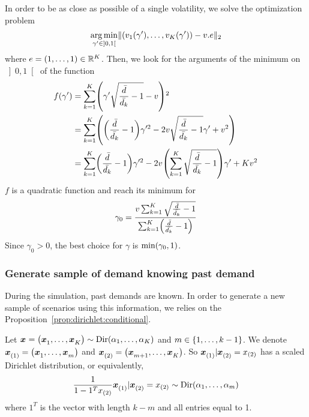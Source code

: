 In order to be as close as possible of a single volatility, we solve the optimization problem
\begin{equation}\label{eq:dirichlet:optimization}
  \argmin_{\gamma'\in\left]0,1\right[} \norm{\bracket{v_1\bracket{\gamma'},\ldots,v_K\bracket{\gamma'}} - v.e}_2
\end{equation}
where $e=\bracket{1,\ldots,1}\in\RR^K$. Then, we look for the arguments of the minimum on $\left]0,1\right[$ of the function
\begin{subequations}
\begin{align}
  f\bracket{\gamma'}
  &= \sum_{k=1}^K \bracket{\gamma'\sqrt{\frac{\bar{\demand}}{\bar{\demand_k}}-1}-v}^2
  \\
  &= \sum_{k=1}^K
  \bracket{
  \bracket{\frac{\bar{\demand}}{\bar{\demand_k}}-1}\gamma'^2
  - 2v\sqrt{\frac{\bar{\demand}}{\bar{\demand_k}}-1}\gamma'
  + v^2
  }
  \\
  &= \sum_{k=1}^K\bracket{\frac{\bar{\demand}}{\bar{\demand_k}}-1}\gamma'^2
  - 2v\bracket{\sum_{k=1}^K\sqrt{\frac{\bar{\demand}}{\bar{\demand_k}}-1}}\gamma'
  + K v^2
\end{align}
\end{subequations}
$f$ is a quadratic function and reach its minimum for
\begin{equation}
  \gamma_0
  =
  \frac
  {v\sum_{k=1}^K\sqrt{\frac{\bar{\demand}}{\bar{\demand_k}}-1}}
  {\sum_{k=1}^K\bracket{\frac{\bar{\demand}}{\bar{\demand_k}}-1}}
\end{equation}
Since $\gamma_0>0$, the best choice for $\gamma$ is $\min\bracket{\gamma_0,1}$.




\subsubsection{Generate sample of demand knowing past demand}


During the simulation, past demands are known. In order to generate a new sample of scenarios using this information, we relies on the Proposition~\ref{prop:dirichlet:conditional}.


\begin{prop}\label{prop:dirichlet:conditional}
  Let $\va x=\bracket{\va x_1,\ldots,\va x_K}\sim \Dir\bracket{\alpha_1,\ldots,\alpha_K}$ and $m\in\range[1]{k-1}$.
  We denote $\va x_{(1)}=\bracket{\va x_1,\ldots,\va x_m}$ and $\va x_{(2)}=\bracket{\va x_{m+1},\ldots,\va x_K}$.
  So $\va x_{(1)}|\va x_{(2)}=x_{(2)}$ has a scaled Dirichlet distribution, or equivalently,
  $$
  \frac{1}{1-1^T x_{(2)}} \va x_{(1)}|\va x_{(2)}=x_{(2)}
  \sim
  \Dir\bracket{\alpha_1,\ldots,\alpha_m}
  $$
  where $1^T$ is the vector with length $k-m$ and all entries equal to 1.
\end{prop}

